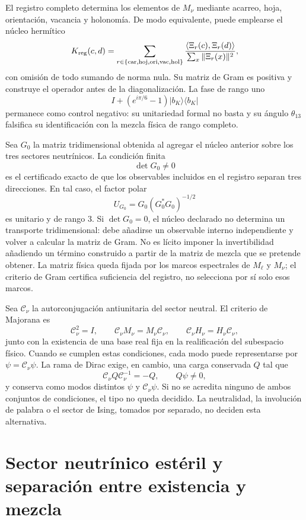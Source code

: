 El registro completo determina los elementos de \(M_\nu\) mediante acarreo,
hoja, orientación, vacancia y holonomía. De modo equivalente, puede emplearse
el núcleo hermítico
\[
 K_{\rm reg}(c,d)
 =\sum_{r\in\{\rm car,hoj,ori,vac,hol\}}
 \frac{\langle\Xi_r(c),\Xi_r(d)\rangle}
      {\sum_x\|\Xi_r(x)\|^2},
\]
con omisión de todo sumando de norma nula. Su matriz de Gram es positiva y
construye el operador antes de la diagonalización. La fase de rango uno
\[
 I+(e^{i\pi/6}-1)|b_K\rangle\langle b_K|
\]
permanece como control negativo: su unitariedad formal no basta y su ángulo
\(\theta_{13}\) falsifica su identificación con la mezcla física de rango
completo.

Sea \(G_0\) la matriz tridimensional obtenida al agregar el núcleo anterior
sobre los tres sectores neutrínicos. La condición finita
\[
 \det G_0\ne0
\]
es el certificado exacto de que los observables incluidos en el registro
separan tres direcciones. En tal caso, el factor polar
\[
 U_{G_0}=G_0(G_0^*G_0)^{-1/2}
\]
es unitario y de rango \(3\). Si \(\det G_0=0\), el núcleo declarado no
determina un transporte tridimensional: debe añadirse un observable interno
independiente y volver a calcular la matriz de Gram. No es lícito imponer la
invertibilidad añadiendo un término construido a partir de la matriz de mezcla
que se pretende obtener. La matriz física queda fijada por los marcos
espectrales de \(M_\ell\) y \(M_\nu\); el criterio de Gram certifica suficiencia
del registro, no selecciona por sí solo esos marcos.

Sea \(\mathcal C_\nu\) la autorconjugación antiunitaria del sector neutral. El
criterio de Majorana es
\[
 \mathcal C_\nu^2=I,
 \qquad
 \mathcal C_\nu M_\nu=M_\nu\mathcal C_\nu,
 \qquad
 \mathcal C_\nu H_\nu=H_\nu\mathcal C_\nu,
\]
junto con la existencia de una base real fija en la realificación del
subespacio físico. Cuando se cumplen estas condiciones, cada modo puede
representarse por \(\psi=\mathcal C_\nu\psi\). La rama de Dirac exige, en
cambio, una carga conservada \(Q\) tal que
\[
 \mathcal C_\nu Q\mathcal C_\nu^{-1}=-Q,
 \qquad Q\psi\ne0,
\]
y conserva como modos distintos \(\psi\) y \(\mathcal C_\nu\psi\). Si no se
acredita ninguno de ambos conjuntos de condiciones, el tipo no queda decidido.
La neutralidad, la involución de palabra o el sector de Ising, tomados por
separado, no deciden esta alternativa.

\section{Sector neutrínico estéril y separación entre existencia y mezcla}

